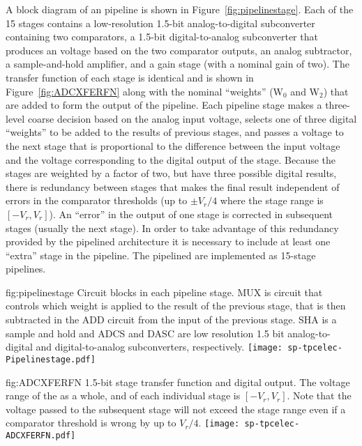 A block diagram of an  pipeline is shown in
Figure~\ref{fig:pipelinestage}. Each of the \num{15} stages contains a low-resolution
\num{1.5}-bit analog-to-digital subconverter containing two comparators, a
\num{1.5}-bit digital-to-analog subconverter that produces an voltage based on
the two comparator outputs, an analog subtractor, a sample-and-hold amplifier,
and a gain stage (with a nominal gain of two). The transfer function of
each stage is identical and is shown in Figure~\ref{fig:ADCXFERFN} along with
the nominal ``weights'' (W$_0$ and W$_2$) that are added to form the output of the
pipeline. Each pipeline stage makes a three-level coarse decision based on the
analog input voltage, selects one of three digital ``weights'' to be added to the
results of previous stages, and passes a voltage to the next stage that is
proportional to the difference between the input voltage and the voltage
corresponding to the digital output of the stage.  Because the stages are
weighted by a factor of two, but have three possible digital results, there is
redundancy between stages that makes the final result independent of errors in
the comparator thresholds (up to $\pm V_r/4$ where the stage range is
$[-V_r,V_r]$).  An ``error'' in the output of one stage is corrected in subsequent
stages (usually the next stage).  In order to take advantage of this redundancy
provided by the pipelined architecture it is necessary to include at least one
``extra'' stage in the pipeline.  The  pipelined  are
implemented as \num{15}-stage pipelines.

\begin{dunefigure}
{fig:pipelinestage}
{Circuit blocks in each  pipeline stage. MUX is circuit that controls
which weight is applied to the result of the previous stage, that is then subtracted
in the ADD circuit from the input of the previous stage. SHA is a sample and hold and
ADCS and DASC are low resolution 1.5 bit analog-to-digital and digital-to-analog 
subconverters, respectively.}
\texttt{[image: sp-tpcelec-Pipelinestage.pdf]}
\end{dunefigure}

\begin{dunefigure}
{fig:ADCXFERFN}
{\num{1.5}-bit stage transfer function and digital output. The voltage 
range of the  as a whole, and of each individual stage 
is $[-V_r,V_r]$.  Note that the voltage passed to the subsequent 
stage will not exceed the stage range even if a comparator threshold 
is wrong by up to $V_r/4$.}
\texttt{[image: sp-tpcelec-ADCXFERFN.pdf]}
\end{dunefigure}

